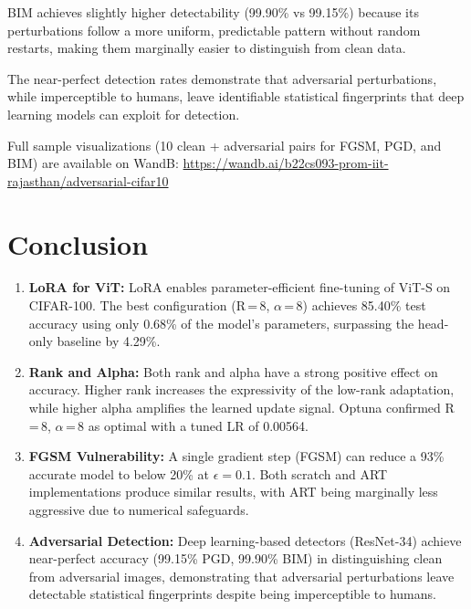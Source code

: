 \documentclass[12pt,a4paper]{article}
\begin{document}
BIM achieves slightly higher detectability (99.90\% vs 99.15\%) because its perturbations follow a more uniform, predictable pattern without random restarts, making them marginally easier to distinguish from clean data.

The near-perfect detection rates demonstrate that adversarial perturbations, while imperceptible to humans, leave identifiable statistical fingerprints that deep learning models can exploit for detection.

Full sample visualizations (10 clean + adversarial pairs for FGSM, PGD, and BIM) are available on WandB:
\url{https://wandb.ai/b22cs093-prom-iit-rajasthan/adversarial-cifar10}

\section{Conclusion}

\begin{enumerate}
    \item \textbf{LoRA for ViT:} LoRA enables parameter-efficient fine-tuning of ViT-S on CIFAR-100. The best configuration (R\,=\,8, $\alpha$\,=\,8) achieves 85.40\% test accuracy using only 0.68\% of the model's parameters, surpassing the head-only baseline by 4.29\%.

    \item \textbf{Rank and Alpha:} Both rank and alpha have a strong positive effect on accuracy. Higher rank increases the expressivity of the low-rank adaptation, while higher alpha amplifies the learned update signal. Optuna confirmed R\,=\,8, $\alpha$\,=\,8 as optimal with a tuned LR of 0.00564.

    \item \textbf{FGSM Vulnerability:} A single gradient step (FGSM) can reduce a 93\% accurate model to below 20\% at $\epsilon = 0.1$. Both scratch and ART implementations produce similar results, with ART being marginally less aggressive due to numerical safeguards.

    \item \textbf{Adversarial Detection:} Deep learning-based detectors (ResNet-34) achieve near-perfect accuracy (99.15\% PGD, 99.90\% BIM) in distinguishing clean from adversarial images, demonstrating that adversarial perturbations leave detectable statistical fingerprints despite being imperceptible to humans.
\end{enumerate}
\end{document}
